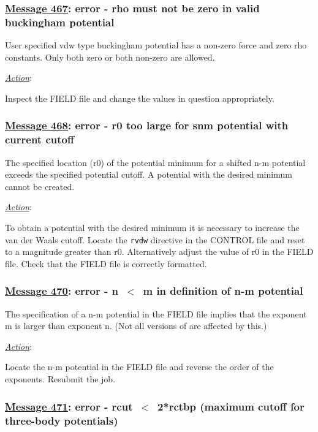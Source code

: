 \subsubsection*{\underline{Message 467}: error - rho must not be zero in valid buckingham potential}

User specified vdw type buckingham potential has a non-zero force
and zero rho constants.  Only both zero or both non-zero are allowed.

\noindent \underline{\em Action}:

Inspect the FIELD file and change the values in question appropriately.

\subsubsection*{\underline{Message 468}: error - r0 too large for snm potential with current cutoff}

The specified location (r0) of the potential minimum for a shifted
n-m potential exceeds the specified potential cutoff. A potential
with the desired minimum cannot be created.

\noindent \underline{\em Action}:

To obtain a potential with the desired minimum it is necessary to
increase the van der Waals cutoff.  Locate the {\tt rvdw}
directive in the CONTROL file and reset to a magnitude greater
than r0.  Alternatively adjust the value of r0 in the FIELD file.
Check that the FIELD file is correctly formatted.

\subsubsection*{\underline{Message 470}: error - n~$<$~m in definition of n-m potential}

The specification of a n-m potential in the FIELD file implies
that the exponent m is larger than exponent n.  (Not all versions
of \D are affected by this.)

\noindent \underline{\em Action}:

Locate the n-m potential in the FIELD file and reverse the order
of the exponents.  Resubmit the job.

\subsubsection*{\underline{Message 471}: error - rcut~$<$~2*rctbp (maximum cutoff for three-body potentials)}

